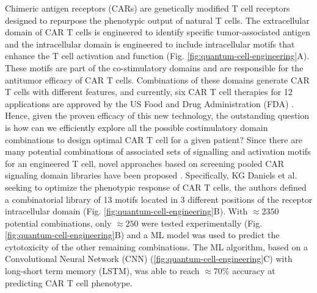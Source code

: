 \documentclass{article}
\begin{document}
Chimeric antigen receptors (CARs) are genetically modified T cell receptors designed to repurpose the phenotypic output of natural T cells. The extracellular domain of CAR T cells is engineered to identify specific tumor-associated antigen and the intracellular domain is engineered to include intracellular motifs that enhance the T cell activation and function (Fig. \ref{fig:quantum-cell-engineering}A). These motifs are part of the co-stimulatory domains and are responsible for the antitumor efficacy of CAR T cells. Combinations of these domains generate CAR T cells with different features, and currently, six CAR T cell therapies for 12 applications are approved by the US Food and Drug Administration (FDA) \cite{labanieh2023car}. Hence, given the proven efficacy of this new technology, the outstanding question is how can we efficiently explore all the possible costimulatory domain combinations to design optimal CAR T cell for a given patient? Since there are many potential combinations of associated sets of signalling and activation motifs for an engineered T cell, novel approaches based on screening pooled CAR signaling domain libraries have been proposed \cite{gordon2022screening,castellanos2022speedingcars}. Specifically, KG Daniels et al.~\cite{daniels2022decoding} seeking to optimize the phenotypic response of CAR T cells, the authors defined a combinatorial library of 13 motifs located in 3 different positions of the receptor intracellular domain (Fig. \ref{fig:quantum-cell-engineering}B). With $\approx2350$ potential combinations, only $\approx250$ were tested experimentally (Fig. \ref{fig:quantum-cell-engineering}B) and a ML model was used to predict the cytotoxicity of the other remaining combinations. The ML algorithm, based on a Convolutional Neural Network (CNN) (\ref{fig:quantum-cell-engineering}C) with long-short term memory (LSTM), was able to reach $\approx70$\% accuracy at predicting CAR T cell phenotype. 
\end{document}
